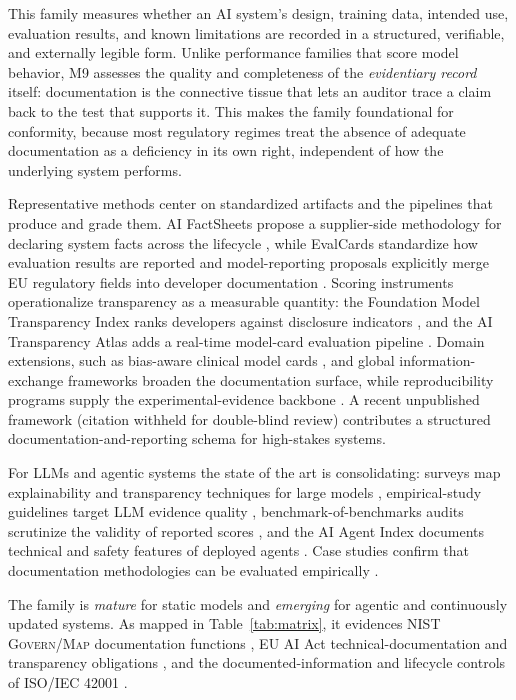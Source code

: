This family measures whether an AI system's design, training data, intended use, evaluation results, and known limitations are recorded in a structured, verifiable, and externally legible form. Unlike performance families that score model behavior, M9 assesses the quality and completeness of the \textit{evidentiary record} itself: documentation is the connective tissue that lets an auditor trace a claim back to the test that supports it. This makes the family foundational for conformity, because most regulatory regimes treat the absence of adequate documentation as a deficiency in its own right, independent of how the underlying system performs.

Representative methods center on standardized artifacts and the pipelines that produce and grade them. AI FactSheets propose a supplier-side methodology for declaring system facts across the lifecycle \cite{weidinger2024aifactsheets}, while EvalCards standardize how evaluation results are reported \cite{lin2025evalcards} and model-reporting proposals explicitly merge EU regulatory fields into developer documentation \cite{pan2024modelreporting}. Scoring instruments operationalize transparency as a measurable quantity: the Foundation Model Transparency Index ranks developers against disclosure indicators \cite{wan2025fmti}, and the AI Transparency Atlas adds a real-time model-card evaluation pipeline \cite{shah2025aitransparencyatlas}. Domain extensions, such as bias-aware clinical model cards \cite{tong2024benchmarking}, and global information-exchange frameworks \cite{weidinger2023framework} broaden the documentation surface, while reproducibility programs supply the experimental-evidence backbone \cite{pineau2020reproducibility}. A recent unpublished framework (citation withheld for double-blind review) contributes a structured documentation-and-reporting schema for high-stakes systems.

For LLMs and agentic systems the state of the art is consolidating: surveys map explainability and transparency techniques for large models \cite{zhang2025transparentai,liang2023aiglmsurvey}, empirical-study guidelines target LLM evidence quality \cite{mehdipour2025evaluation}, benchmark-of-benchmarks audits scrutinize the validity of reported scores \cite{qian2025benchmark2}, and the AI Agent Index documents technical and safety features of deployed agents \cite{li2025aiagentindex}. Case studies confirm that documentation methodologies can be evaluated empirically \cite{yang2024evaluating}.

The family is \textit{mature} for static models and \textit{emerging} for agentic and continuously updated systems. As mapped in Table~\ref{tab:matrix}, it evidences NIST \textsc{Govern}/\textsc{Map} documentation functions \cite{nist2023airmf,nist2024genai}, EU AI Act technical-documentation and transparency obligations \cite{euaiact2024}, and the documented-information and lifecycle controls of ISO/IEC 42001 \cite{iso42001}.


